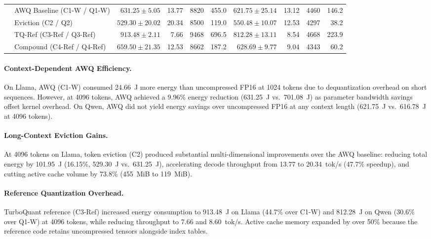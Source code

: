 \documentclass[sigconf,nonacm]{acmart}
\begin{document}
\begin{table}[t]
{\begin{tabular}{@{}ll rrrr rrrr@{}}
     & AWQ Baseline (C1-W / Q1-W)  & $631.25 \pm 5.05$  & 13.77 & 8820  & 455.0 & $621.75 \pm 25.14$ & 13.12 & 4460 & 146.2 \\
     & Eviction (C2 / Q2)          & $529.30 \pm 20.02$ & 20.34 & 8500  & 119.0 & $550.48 \pm 10.07$ & 12.53 & 4297 &  38.2 \\
     & TQ-Ref (C3-Ref / Q3-Ref)    & $913.48 \pm 2.11$  &  7.66 & 9468  & 696.5 & $812.28 \pm 13.11$ &  8.54 & 4668 & 223.9 \\
     & Compound (C4-Ref / Q4-Ref)  & $659.50 \pm 21.35$ & 12.53 & 8662  & 187.2 & $628.69 \pm 9.77$  &  9.04 & 4343 &  60.2 \\
\bottomrule
\end{tabular}}
\end{table}

\paragraph{Context-Dependent AWQ Efficiency.}
On Llama, AWQ (C1-W) consumed 24.66~J more energy than uncompressed FP16 at 1024 tokens due to dequantization overhead on short sequences. However, at 4096 tokens, AWQ achieved a 9.96\% energy reduction (631.25~J vs.\ 701.08~J) as parameter bandwidth savings offset kernel overhead. On Qwen, AWQ did not yield energy savings over uncompressed FP16 at any context length (621.75~J vs.\ 616.78~J at 4096 tokens).

\paragraph{Long-Context Eviction Gains.}
At 4096 tokens on Llama, token eviction (C2) produced substantial multi-dimensional improvements over the AWQ baseline: reducing total energy by 101.95~J (16.15\%, 529.30~J vs.\ 631.25~J), accelerating decode throughput from 13.77 to 20.34~tok/s (47.7\% speedup), and cutting active cache volume by 73.8\% (455~MiB to 119~MiB).

\paragraph{Reference Quantization Overhead.}
TurboQuant reference (C3-Ref) increased energy consumption to 913.48~J on Llama (44.7\% over C1-W) and 812.28~J on Qwen (30.6\% over Q1-W) at 4096 tokens, while reducing throughput to 7.66 and 8.60~tok/s. Active cache memory expanded by over 50\% because the reference code retains uncompressed tensors alongside index tables.
\end{document}
